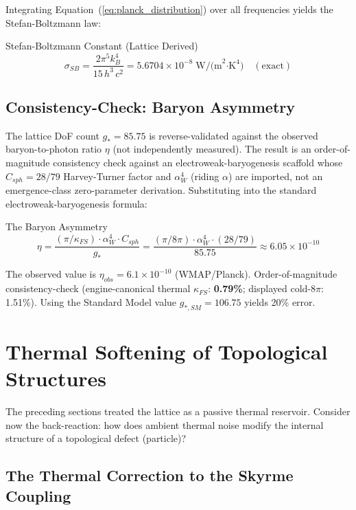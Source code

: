 Integrating Equation~(\ref{eq:planck_distribution}) over all frequencies yields the Stefan-Boltzmann law:
\begin{resultbox}{Stefan-Boltzmann Constant (Lattice Derived)}
\begin{equation}
    \sigma_{SB} = \frac{2\pi^5 k_B^4}{15\,h^3\,c^2} = 5.6704 \times 10^{-8} \;\text{W/(m}^2\text{·K}^4\text{)} \quad (\text{exact})
\end{equation}
\end{resultbox}

\subsection{Consistency-Check: Baryon Asymmetry}

The lattice DoF count $g_* = 85.75$ is reverse-validated against the observed baryon-to-photon ratio $\eta$ (not independently measured). The result is an order-of-magnitude consistency check against an electroweak-baryogenesis scaffold whose $C_{sph} = 28/79$ Harvey-Turner factor and $\alpha_W^4$ (riding $\alpha$) are imported, not an emergence-class zero-parameter derivation. Substituting into the standard electroweak-baryogenesis formula:
\begin{resultbox}{The Baryon Asymmetry}
\begin{equation}
    \eta = \frac{(\pi / \kappa_{FS}) \cdot \alpha_W^4 \cdot C_{sph}}{g_*} = \frac{(\pi / 8\pi) \cdot \alpha_W^4 \cdot (28/79)}{85.75} \approx 6.05 \times 10^{-10}
    \label{eq:baryon_asymmetry}
\end{equation}
\end{resultbox}
The observed value is $\eta_{obs} = 6.1 \times 10^{-10}$ (WMAP/Planck). Order-of-magnitude consistency-check (engine-canonical thermal $\kappa_{FS}$: \textbf{0.79\%}; displayed cold-$8\pi$: 1.51\%).
Using the Standard Model value $g_{*,SM} = 106.75$ yields 20\% error.

\section{Thermal Softening of Topological Structures}
\label{sec:thermal_softening_thermo}

The preceding sections treated the lattice as a passive thermal reservoir. Consider now the back-reaction: how does ambient thermal noise modify the internal structure of a topological defect (particle)?

\subsection{The Thermal Correction to the Skyrme Coupling}

